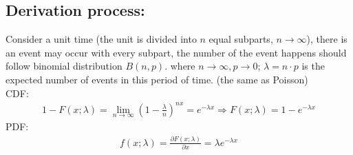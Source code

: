 \documentclass[11pt]{elegantbook}
\begin{document}
\subsection*{Derivation process:}

Consider a unit time (the unit is divided into $n$ equal subparts, $n \rightarrow \infty$), there is an event may occur with every subpart, the number of the event happens should follow binomial distribution $B(n,p)$. where $n \rightarrow \infty, p \rightarrow 0$; $\lambda=n\cdot p$ is the expected number of events in this period of time. (the same as Poisson)\\
CDF:
\begin{equation}
    \begin{aligned}
        1-F(x;\lambda)=\lim_{n \rightarrow \infty}(1-\frac{\lambda}{n})^{nx}=e^{-\lambda x}
        \Rightarrow F(x;\lambda)=1-e^{-\lambda x}
    \end{aligned}
    \nonumber
\end{equation}
PDF:
\begin{equation}
    \begin{aligned}
        f(x;\lambda)=\frac{\partial F(x;\lambda)}{\partial x}=\lambda e^{-\lambda x}
    \end{aligned}
    \nonumber
\end{equation}
\end{document}
